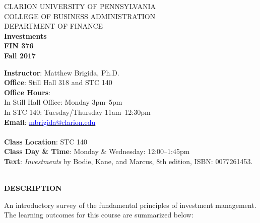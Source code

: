 \documentclass{article}
\begin{document}
\begin{center}
CLARION UNIVERSITY OF PENNSYLVANIA\\
COLLEGE OF BUSINESS ADMINISTRATION\\
DEPARTMENT OF FINANCE
\\
{\bf Investments}\\
{\bf FIN 376}\\
{\bf Fall 2017}\\
\end{center}
\vspace*{5pt}
{\bf Instructor}: Matthew Brigida, Ph.D. \\
{\bf Office}: Still Hall 318 and STC 140\\
{\bf Office Hours}: \\
In Still Hall Office: Monday 3pm--5pm \\
In STC 140: Tuesday/Thursday 11am--12:30pm\\
{\bf Email}: 
\href{mailto:mbrigida@clarion.edu}{\textcolor{blue}{mbrigida@clarion.edu}} \\
\\
{\bf Class Location}:  STC 140\\
{\bf Class Day \& Time}: Monday \& Wednesday: 12:00--1:45pm
\\
{\bf Text}: {\it Investments} by Bodie, Kane, and Marcus, 8th edition, ISBN: 0077261453.
\\
\\
\begin{center}
{\bf DESCRIPTION}
\end{center}  
An introductory survey of the fundamental principles of investment management.
The learning outcomes for this course are summarized below:
\end{document}
